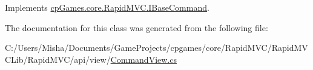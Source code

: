 Implements \mbox{\hyperlink{interfacecp_games_1_1core_1_1_rapid_m_v_c_1_1_i_base_command_aaf935c8b144d93bffac5b2e4fbe9881b}{cp\+Games.\+core.\+Rapid\+M\+V\+C.\+I\+Base\+Command}}.



The documentation for this class was generated from the following file\+:\begin{DoxyCompactItemize}
\item 
C\+:/\+Users/\+Misha/\+Documents/\+Game\+Projects/cpgames/core/\+Rapid\+M\+V\+C/\+Rapid\+M\+V\+C\+Lib/\+Rapid\+M\+V\+C/api/view/\mbox{\hyperlink{_command_view_8cs}{Command\+View.\+cs}}\end{DoxyCompactItemize}
